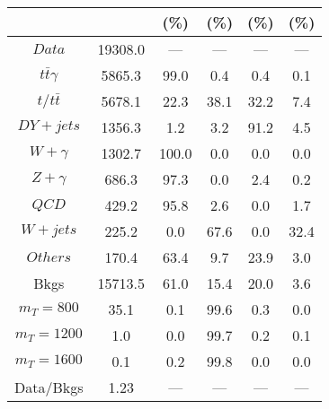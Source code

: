 \begin{figure}
\begin{minipage}[c]{0.32\textwidth}
{\begin{tabular}{cccccc}
 &  & (\%) & (\%) & (\%) & (\%)  \\
\hline
                                                                      $ Data $ &  19308.0 &  --- &  --- &  --- &  ---\\
$ t\bar{t}\gamma $ &  5865.3 &  99.0 &  0.4 &  0.4 &  0.1\\
$ t/t\bar{t} $ &  5678.1 &  22.3 &  38.1 &  32.2 &  7.4\\
$ DY+jets $ &  1356.3 &  1.2 &  3.2 &  91.2 &  4.5\\
$ W+\gamma $ &  1302.7 &  100.0 &  0.0 &  0.0 &  0.0\\
$ Z+\gamma $ &  686.3 &  97.3 &  0.0 &  2.4 &  0.2\\
$ QCD $ &  429.2 &  95.8 &  2.6 &  0.0 &  1.7\\
$ W+jets $ &  225.2 &  0.0 &  67.6 &  0.0 &  32.4\\
$ Others $ &  170.4 &  63.4 &  9.7 &  23.9 &  3.0\\
Bkgs &  15713.5 &  61.0 &  15.4 &  20.0 &  3.6\\
$ m_{T} = 800 $ &  35.1 &  0.1 &  99.6 &  0.3 &  0.0\\
$ m_{T} = 1200 $ &  1.0 &  0.0 &  99.7 &  0.2 &  0.1\\
$ m_{T} = 1600 $ &  0.1 &  0.2 &  99.8 &  0.0 &  0.0\\
Data/Bkgs &  1.23 &  --- &  --- &  --- &  ---\\
\hline
\end{tabular}
}
\end{minipage}
\end{figure}

